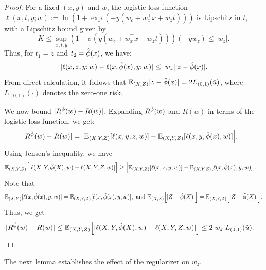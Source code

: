 \begin{proof}
    For a fixed $(x,y)$ and $w$, the logistic loss function $\ell(x,t,y;w) := \ln(1+\exp(-y(w_c + w_x^\top x + w_zt)))$ is Lipschitz in $t$, with a Lipschitz bound given by
    \begin{equation*}
        K \leq \sup_{x,t,y}(1-\sigma(y(w_c+w_x^\top x+w_zt)))(-yw_z) \leq |w_z|.
    \end{equation*}
    Thus, for $t_1 = z$ and $t_2 = \hat{\phi}(x)$, we have:
    \begin{equation*}
        |\ell(x,z,y;w) - \ell(x,\hat{\phi}(x),y;w)| \leq |w_z||z-\hat{\phi}(x)|.
    \end{equation*}
From direct calculation, it follows that $\mathbb{E}_{(X,Z)}|z-\hat{\phi}(x)| = 2L_{(0,1)}(\hat{u})$, where $L_{(0,1)}(\cdot)$ denotes the zero-one risk.

\noindent We now bound $|R^{\hat{\phi}}(w) - R(w)|$. Expanding $R^{\hat{\phi}}(w)$ and $R(w)$ in terms of the logistic loss function, we get:
    \begin{equation*}
    \begin{aligned}
        |R^{\hat{\phi}}(w) - R(w)| &= \Big|\mathbb{E}_{(X,Y,Z)}[\ell(x,y,z,w)] - \mathbb{E}_{(X,Y,Z)}[\ell(x,y,\hat{\phi}(x),w)]\Big|.
    \end{aligned}
    \end{equation*}
 Using Jensen's inequality, we have
    \begin{equation*}
    \begin{aligned}
        &\mathbb{E}_{(X,Y,Z)}\Big[|\ell(X,Y,\hat{\phi}(X),w) - \ell(X,Y,Z,w)|\Big] \geq \Big|\mathbb{E}_{(X,Y,Z)}[\ell(x,z,y,w)] - \mathbb{E}_{(X,Y,Z)}[\ell(x,\hat{\phi}(x),y,w)]\Big|.
    \end{aligned}
    \end{equation*}
Note that
    \begin{equation*}
        \mathbb{E}_{(X,Y)}[\ell(x,\hat{\phi}(x),y,w)] = \mathbb{E}_{(X,Y,Z)}[\ell(x,\hat{\phi}(x),y,w)], \text{ and }
        \mathbb{E}_{(X,Z)}\Big[|Z-\hat{\phi}(X)|\Big] = \mathbb{E}_{(X,Y,Z)}\Big[|Z-\hat{\phi}(X)|\Big].
    \end{equation*}
Thus, we get
    \begin{equation*}
    \begin{aligned}
        |R^{\hat{\phi}}(w) - R(w)|
        &\leq
        \mathbb{E}_{(X,Y,Z)}\Big[|\ell(X,Y,\hat{\phi}(X),w) - \ell(X,Y,Z,w)|\Big] \leq
        2|w_z|L_{(0,1)}(\hat{u}).
    \end{aligned}
    \end{equation*}
\end{proof}

The next lemma establishes the effect of the regularizer on $w_z$.

